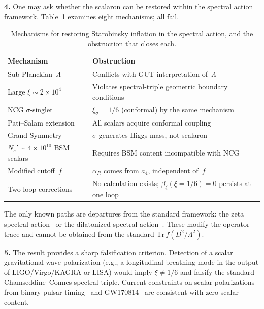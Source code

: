 \documentclass[12pt]{article}
\begin{document}
\medskip

\noindent\textbf{4.}
One may ask whether the scalaron can be restored within the
spectral action framework.  Table~\ref{tab:escape} examines
eight mechanisms; all fail.

\begin{table}[ht]
\centering
\caption{Mechanisms for restoring Starobinsky inflation
  in the spectral action, and the obstruction that closes each.}
\label{tab:escape}
\begin{tabular}{p{3.8cm}p{6.5cm}}
\toprule
Mechanism & Obstruction \\
\midrule
Sub-Planckian~$\Lambda$ &
  Conflicts with GUT interpretation of~$\Lambda$ \\
Large $\xi \sim 2 \times 10^4$ &
  Violates spectral-triple geometric boundary conditions \\
NCG $\sigma$-singlet~\cite{BFS:2010} &
  $\xi_\sigma = 1/6$ (conformal) by the same mechanism \\
Pati--Salam extension~\cite{CCS:2013ps} &
  All scalars acquire conformal coupling \\
Grand Symmetry~\cite{CCS:2013gs} &
  $\sigma$ generates Higgs mass, not scalaron \\
$N_s' \sim 4 \times 10^{10}$ BSM scalars &
  Requires BSM content incompatible with NCG \\
Modified cutoff~$f$ &
  $\alpha_R$ comes from $a_4$, independent of~$f$ \\
Two-loop corrections &
  No calculation exists; $\beta_\xi(\xi=1/6) = 0$ persists at one loop \\
\bottomrule
\end{tabular}
\end{table}

The only known paths are departures from the standard framework:
the zeta spectral action~\cite{KLV:2015} or the dilatonized
spectral action~\cite{CC:2006dilaton}.  These modify the
operator trace and cannot be obtained from the standard
$\mathrm{Tr}\,f(D^2/\Lambda^2)$.

\medskip

\noindent\textbf{5.}
The result provides a sharp falsification criterion.  Detection
of a scalar gravitational wave polarization (e.g., a
longitudinal breathing mode in the output of LIGO/Virgo/KAGRA
or LISA) would imply $\xi \neq 1/6$ and falsify the standard
Chamseddine--Connes spectral triple.  Current constraints on
scalar polarizations from binary pulsar timing~\cite{Stairs:2003}
and GW170814~\cite{GW170814:2017} are consistent with zero
scalar content.
\end{document}
